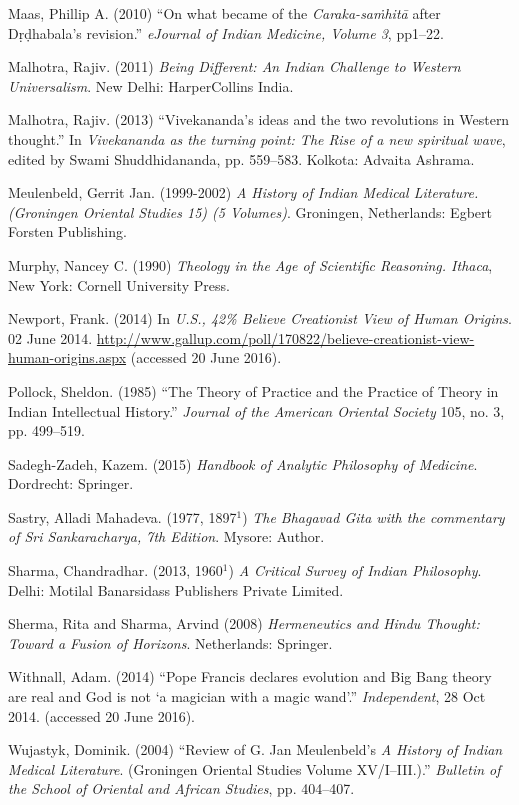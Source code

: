\begin{thebibliography}{99}
Maas, Phillip A. (2010) ``On what became of the {\sl Caraka-saṁhitā} after Dṛḍhabala's revision.'' {\sl eJournal of Indian Medicine, Volume 3}, pp1--22.

Malhotra, Rajiv. (2011) {\sl Being Different: An Indian Challenge to Western Universalism}. New Delhi: HarperCollins India.

Malhotra, Rajiv. (2013) ``Vivekananda's ideas and the two revolutions in Western thought.'' In {\sl Vivekananda as the turning point: The Rise of a new spiritual wave}, edited by Swami Shuddhidananda, pp. 559--583. Kolkota: Advaita Ashrama.

Meulenbeld, Gerrit Jan. (1999-2002) {\sl A History of Indian Medical Literature. (Groningen Oriental Studies 15) (5 Volumes)}. Groningen, Netherlands: Egbert Forsten Publishing.

Murphy, Nancey C. (1990) {\sl Theology in the Age of Scientific Reasoning. Ithaca}, New York: Cornell University Press.

Newport, Frank. (2014) In {\sl U.S., 42\% Believe Creationist View of Human Origins}. 02 June 2014. \url{http://www.gallup.com/poll/170822/believe-creationist-view-human-origins.aspx} (accessed 20 June 2016).

Pollock, Sheldon. (1985) ``The Theory of Practice and the Practice of Theory in Indian Intellectual History.'' {\sl Journal of the American Oriental Society} 105, no. 3, pp. 499--519.

Sadegh-Zadeh, Kazem. (2015) {\sl Handbook of Analytic Philosophy of Medicine}. Dordrecht: Springer.

Sastry, Alladi Mahadeva. (1977, 1897$^1$) {\sl The Bhagavad Gita with the commentary of Sri Sankaracharya, 7th Edition}. Mysore: Author.

Sharma, Chandradhar. (2013, 1960$^{1}$) {\sl A Critical Survey of Indian Philosophy}. Delhi: Motilal Banarsidass Publishers Private Limited.

Sherma, Rita and Sharma, Arvind (2008) {\sl Hermeneutics and Hindu Thought: Toward a Fusion of Horizons}. Netherlands: Springer.

Withnall, Adam. (2014) ``Pope Francis declares evolution and Big Bang theory are real and God is not `a magician with a magic wand'.'' {\sl Independent}, 28 Oct 2014. (accessed 20 June 2016).

Wujastyk, Dominik. (2004) ``Review of G. Jan Meulenbeld's {\sl A History of Indian Medical Literature}. (Groningen Oriental Studies Volume XV/I--III.).'' {\sl Bulletin of the School of Oriental and African Studies}, pp. 404--407.
\end{thebibliography}

\theendnotes
\label{chapter\thechapter:end}
